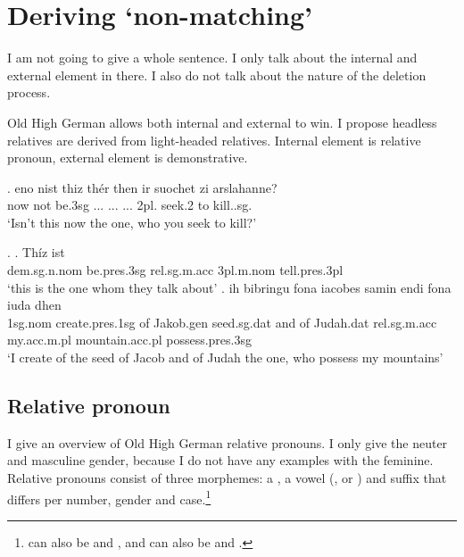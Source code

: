 \section{Deriving `non-matching'}\label{deriving non-matching}

I am not going to give a whole sentence. I only talk about the internal and external element in there. I also do not talk about the nature of the deletion process.

Old High German allows both internal and external to win. I propose headless relatives are derived from light-headed relatives. Internal element is relative pronoun, external element is demonstrative.

\exg. eno nist thiz thér then ir suochet zi arslahanne?\\
 now {not be.3\ac{sg}} ... ...
 ... 2\ac{pl}. seek.2 to kill..\ac{sg}.\\
 `Isn't this now the one, who you seek to kill?'




\ex.
\ag. Thíz ist   \\
\ac{dem}.\ac{sg}.\ac{n}.\ac{nom} be.\ac{pres}.3\ac{sg}\scsub{[nom]} \ac{rel}.\ac{sg}.\ac{m}.\ac{acc} 3\ac{pl}.\ac{m}.\ac{nom} tell.\ac{pres}.3\ac{pl}\scsub{[acc]}\\
`this is the one whom they talk about' \label{ex:ohg-nom-acc-intro-rep}
\bg. ih bibringu fona iacobes samin endi fona iuda dhen   \\
1\ac{sg}.\ac{nom} {create}.\ac{pres}.1\ac{sg}\scsub{[acc]} of Jakob.\ac{gen} seed.\ac{sg}.\ac{dat} and of Judah.\ac{dat}
\ac{rel}.\ac{sg}.\ac{m}.\ac{acc} my.\ac{acc}.\ac{m}.\ac{pl} mountain.\ac{acc}.\ac{pl} possess.\ac{pres}.3\ac{sg}\scsub{[nom]}\\
`I create of the seed of Jacob and of Judah the one, who possess my mountains' \label{ex:ohg-acc-nom-intro-rep}

\subsection{Relative pronoun}

I give an overview of Old High German relative pronouns. I only give the neuter and masculine gender, because I do not have any examples with the feminine. Relative pronouns consist of three morphemes: a , a vowel (,  or ) and suffix that differs per number, gender and case.\footnote{
 can also be  and ,  and  can also be  and .
}


